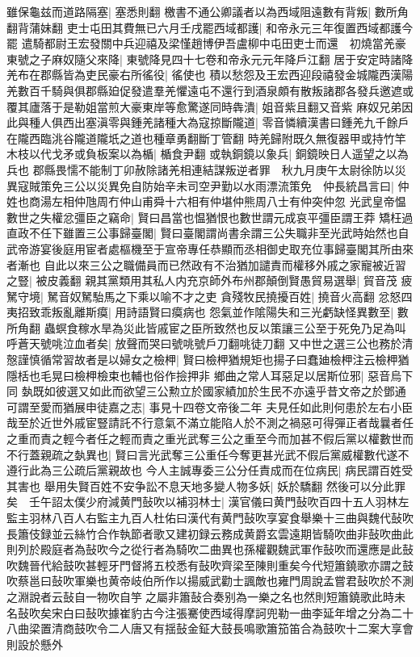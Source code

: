 雖保龜兹而道路隔塞|{
	塞悉則翻}
檄書不通公卿議者以為西域阻遠數有背叛|{
	數所角翻背蒲妹翻}
吏士屯田其費無已六月壬戌罷西域都護|{
	和帝永元三年復置西域都護今罷}
遣騎都尉王宏發關中兵迎禧及梁慬趙博伊吾盧柳中屯田吏士而還　初燒當羌豪東號之子麻奴隨父來降|{
	東號降見四十七卷和帝永元元年降戶江翻}
居于安定時諸降羌布在郡縣皆為吏民豪右所徭役|{
	徭使也}
積以愁怨及王宏西迎段禧發金城隴西漢陽羌數百千騎與俱郡縣廹促發遣羣羌懼遠屯不還行到酒泉頗有散叛諸郡各發兵邀遮或覆其廬落于是勒姐當煎大豪東岸等愈驚遂同時犇潰|{
	姐音紫且翻又音紫}
麻奴兄弟因此與種人俱西出塞滇零與鍾羌諸種大為寇掠斷隴道|{
	零音憐續漢書曰鍾羌九千餘戶在隴西臨洮谷隴道隴坁之道也種章勇翻斷丁管翻}
時羌歸附既久無復器甲或持竹竿木枝以代戈矛或負板案以為楯|{
	楯食尹翻}
或執銅鏡以象兵|{
	銅鏡映日人遥望之以為兵也}
郡縣畏懦不能制丁卯赦除諸羌相連結謀叛逆者罪　秋九月庚午太尉徐防以災異寇賊策免三公以災異免自防始辛未司空尹勤以水雨漂流策免　仲長統昌言曰|{
	仲姓也商湯左相仲虺周冇仲山甫舜十六相有仲堪仲熊周八士有仲突仲忽}
光武皇帝愠數世之失權忿彊臣之竊命|{
	賢曰昌當也愠猶恨也數世謂元成哀平彊臣謂王莽}
矯枉過直政不任下雖置三公事歸臺閣|{
	賢曰臺閣謂尚書余謂三公失職非至光武時始然也自武帝游宴後庭用宦者處樞機至于宣帝專任恭顯而丞相御史取充位事歸臺閣其所由來者漸也}
自此以來三公之職備員而已然政有不治猶加譴責而權移外戚之家寵被近習之豎|{
	被皮義翻}
親其黨類用其私人内充京師外布州郡顛倒賢愚貿易選舉|{
	貿音茂}
疲駑守境|{
	駑音奴駑駘馬之下乘以喻不才之吏}
貪殘牧民撓擾百姓|{
	撓音火高翻}
忿怒四夷招致乖叛亂離斯瘼|{
	用詩語賢曰瘼病也}
怨氣並作隂陽失和三光虧缺怪異數至|{
	數所角翻}
蟲螟食稼水旱為災此皆戚宦之臣所致然也反以策讓三公至于死免乃足為叫呼蒼天號咷泣血者矣|{
	放聲而哭曰號咷號戶刀翻咷徒刀翻}
又中世之選三公也務於清慤謹慎循常習故者是以婦女之檢柙|{
	賢曰檢柙猶規矩也揚子曰蠢廸檢柙注云檢柙猶隱栝也毛晃曰檢柙檢束也輔也俗作撿押非}
鄉曲之常人耳惡足以居斯位邪|{
	惡音烏下同}
埶既如彼選又如此而欲望三公勲立於國家績加於生民不亦遠乎昔文帝之於鄧通可謂至愛而猶展申徒嘉之志|{
	事見十四卷文帝後二年}
夫見任如此則何患於左右小臣哉至於近世外戚宦豎請託不行意氣不滿立能陷人於不測之禍惡可得彈正者哉曩者任之重而責之輕今者任之輕而責之重光武奪三公之重至今而加甚不假后黨以權數世而不行蓋親疏之埶異也|{
	賢曰言光武奪三公重任今奪更甚光武不假后黨威權數代遂不遵行此為三公疏后黨親故也}
今人主誠專委三公分任責成而在位病民|{
	病民謂百姓受其害也}
舉用失賢百姓不安争訟不息天地多變人物多妖|{
	妖於驕翻}
然後可以分此罪矣　壬午詔太僕少府減黄門鼔吹以補羽林士|{
	漢官儀曰黄門鼔吹百四十五人羽林左監主羽林八百人右監主九百人杜佑曰漢代有黄門鼔吹享宴食舉樂十三曲與魏代鼔吹長簫伎録並云絲竹合作執節者歌又建初録云務成黄爵玄雲遠期皆騎吹曲非鼔吹曲此則列於殿庭者為鼔吹今之從行者為騎吹二曲異也孫權觀魏武軍作鼔吹而還應是此鼔吹魏晉代給鼓吹甚輕牙門督將五校悉有鼔吹齊梁至陳則重矣今代短簫鐃歌亦謂之鼓吹蔡邕曰鼔吹軍樂也黄帝岐伯所作以揚威武勸士諷敵也雍門周說孟嘗君鼔吹於不測之淵說者云鼔自一物吹自竽之屬非簫鼔合奏别為一樂之名也然則短簫鐃歌此時未名鼔吹矣宋白曰鼔吹據崔豹古今注張騫使西域得摩訶兜勒一曲李延年增之分為二十八曲梁置清商鼓吹令二人唐又有揺鼔金鉦大鼓長鳴歌簫笳笛合為鼓吹十二案大享會則設於懸外}
